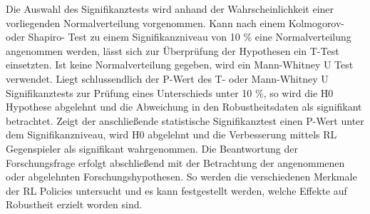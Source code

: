 Die Auswahl des Signifikanztests wird anhand der Wahrscheinlichkeit einer vorliegenden Normalverteilung vorgenommen.
Kann nach einem Kolmogorov- oder Shapiro- Test zu einem Signifikanzniveau von 10 \% eine Normalverteilung angenommen werden, lässt sich zur Überprüfung der Hypothesen ein T-Test einsetzten.
Ist keine Normalverteilung gegeben, wird ein Mann-Whitney U Test verwendet.
Liegt schlussendlich der P-Wert des T- oder Mann-Whitney U Signifikanztests zur Prüfung eines Unterschieds unter 10 \%, so wird die H0 Hypothese abgelehnt und die Abweichung in den Robustheitsdaten als signifikant betrachtet.
Zeigt der anschließende statistische Signifikanztest einen P-Wert unter dem Signifikanzniveau, wird H0 abgelehnt und die Verbesserung mittels RL Gegenspieler als signifikant wahrgenommen.
Die Beantwortung der Forschungsfrage erfolgt abschließend mit der Betrachtung der angenommenen oder abgelehnten Forschungshypothesen.
So werden die verschiedenen Merkmale der RL Policies untersucht und es kann festgestellt werden, welche Effekte auf Robustheit erzielt worden sind.
